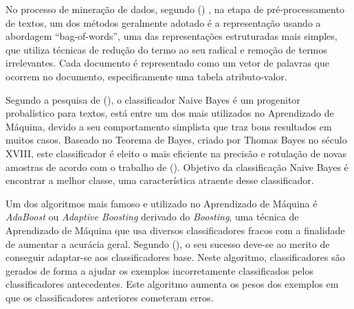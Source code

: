 

No processo de mineração de dados, segundo 
 (\citeyear{matsubara2003pretext}) , na 
etapa de pré-processamento de textos, um dos métodos geralmente adotado é a 
representação usando a abordagem ``bag-of-words'', uma das representações 
estruturadas mais simples, que utiliza técnicas de redução do termo ao seu 
radical e remoção de termos irrelevantes. Cada documento é  representado como 
um vetor de palavras que ocorrem no documento, especificamente uma tabela 
atributo-valor. 

Segundo a pesquisa de  
(\citeyear{de2017mineraccao}), o classificador Naive Bayes é um 
progenitor probalístico para textos, está entre um dos mais utilizados no 
Aprendizado de Máquina, devido a seu comportamento simplista que traz bons 
resultados em muitos casos. Baseado no Teorema de Bayes, criado por Thomas 
Bayes no século XVIII, este classificador é eleito o mais eficiente na precisão 
e rotulação de novas amostras de acordo com o trabalho de 
 (\citeyear{chakrabarti2002mining}). 
Objetivo da classificação Naive Bayes é encontrar a melhor classe, uma 
característica atraente desse classificador.

Um dos algoritmos mais famoso e utilizado no Aprendizado de Máquina é 
\textit{AdaBoost} ou \textit{Adaptive Boosting} derivado do \textit{Boosting}, 
uma técnica de Aprendizado de Máquina que usa diversos classificadores 
fracos com a finalidade de aumentar a acurácia geral. Segundo 
(\citeyear{dos2015detecccao}), o seu sucesso deve-se ao merito 
de conseguir adaptar-se aos classificadores base. Neste algoritmo, 
classificadores são gerados de forma a ajudar os exemplos incorretamente 
classificados pelos classificadores antecedentes. Este algoritmo aumenta os 
pesos dos exemplos em que os classificadores anteriores cometeram erros.
